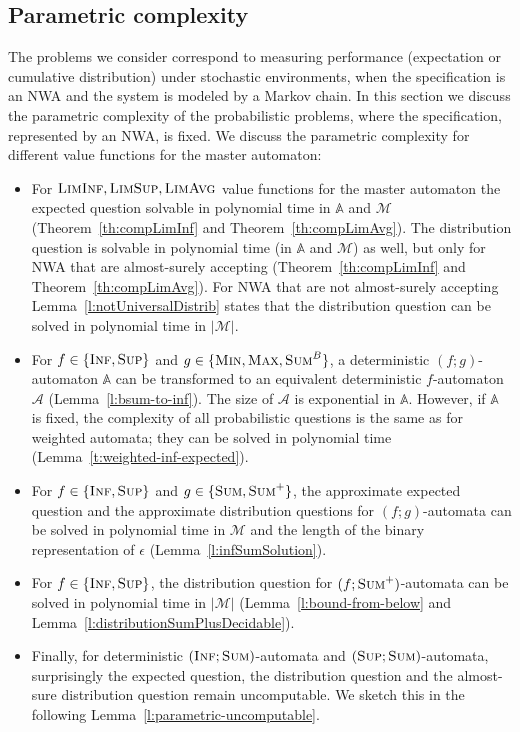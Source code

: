 \documentclass{lmcs}
\newcommand{\nestedA}{\mathbb{A}}
\newcommand{\nonnestedA}{\mathcal{A}}
\newcommand{\fsum}{\textsc{Sum}}
\newcommand{\fBsum}[1]{\textsc{Sum}^{#1}}
\newcommand{\fmax}{\textsc{Max}}
\newcommand{\fmin}{\textsc{Min}}
\newcommand{\flimavg}{\textsc{LimAvg}}
\newcommand{\fliminf}{\textsc{LimInf}}
\newcommand{\flimsup}{\textsc{LimSup}}
\newcommand{\fsup}{\textsc{Sup}}
\newcommand{\finf}{\textsc{Inf}}
\newcommand{\markov}{\mathcal{M}}
\begin{document}
\subsection{Parametric complexity}
The problems we consider correspond to measuring performance (expectation or cumulative distribution) under stochastic environments, when
the specification is an NWA and the system is modeled by a Markov chain.
In this section we discuss the parametric complexity of the probabilistic problems, where the specification, represented by an NWA, is fixed.
We discuss the parametric complexity for different value functions for the master automaton:

\begin{itemize}
\item For $\fliminf, \flimsup, \flimavg$ value functions for the master automaton the expected question  solvable in polynomial time in $\nestedA$ and $\markov$ (Theorem~\ref{th:compLimInf} and Theorem~\ref{th:compLimAvg}).
The distribution question is solvable in polynomial time (in $\nestedA$ and $\markov$) as well,
but only for NWA that are almost-surely accepting (Theorem~\ref{th:compLimInf} and Theorem~\ref{th:compLimAvg}).
For NWA that are not almost-surely accepting Lemma~\ref{l:notUniversalDistrib} states that the distribution question can be solved in polynomial time in $|\markov|$.

\item For $f \in \{\finf,\fsup\}$ and $g \in \{\fmin, \fmax, \fBsum{B}\}$, a deterministic $(f;g)$-automaton $\nestedA$ can be transformed to an equivalent  deterministic $f$-automaton $\nonnestedA$ (Lemma~\ref{l:bsum-to-inf}).
The size of  $\nonnestedA$ is exponential in $\nestedA$. However, if $\nestedA$ is fixed, the complexity of all probabilistic questions is the same as for weighted automata; they can be solved in polynomial time
(Lemma~\ref{t:weighted-inf-expected}).

\item For $f \in \{\finf,\fsup\}$ and $g \in \{\fsum, \fsum^+\}$, the approximate expected question and the approximate distribution questions for $(f;g)$-automata
can be solved in polynomial time in $\markov$ and the length of the binary representation of $\epsilon$ (Lemma~\ref{l:infSumSolution}).

\item For $f \in \{\finf,\fsup\}$, the distribution question for $(f;\fsum^+)$-automata can be solved in polynomial time in $|\markov|$ (Lemma~\ref{l:bound-from-below} and Lemma~\ref{l:distributionSumPlusDecidable}).


\item Finally, for deterministic $(\finf;\fsum)$-automata and $(\fsup;\fsum)$-automata, surprisingly the expected question, the distribution question and the almost-sure distribution question remain uncomputable. We sketch this in the following Lemma~\ref{l:parametric-uncomputable}.
\end{itemize}
\end{document}
